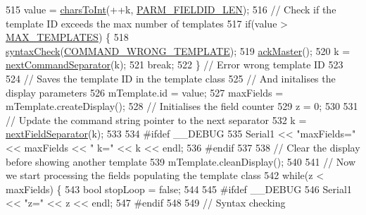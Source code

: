 \begin{DoxyCode}
515             value = \hyperlink{_meditech___chip_kit_control_panel_8pde_ad893e606e19944faa6540bba9387370f}{charsToInt}(++k, \hyperlink{_command_processor_8h_a01ff82405086f08d2af53956b5247a30}{PARM\_FIELDID\_LEN});
516             \textcolor{comment}{// Check if the template ID exceeds the max number of templates}
517             \textcolor{keywordflow}{if}(value > \hyperlink{_l_c_d_templates_8h_a0b935b9f5a6d3f57285fece1aa0a37a5}{MAX\_TEMPLATES}) \{
518               \hyperlink{_meditech___chip_kit_control_panel_8pde_a586164a6eff90eab6ba87a6ca123770d}{syntaxCheck}(\hyperlink{_parser_errors_8h_a5a9f152004095e86df06f3ac426d26fc}{COMMAND\_WRONG\_TEMPLATE});
519               \hyperlink{_meditech___chip_kit_control_panel_8pde_a4e435af9ec30d668c4cff6a97baa8e5a}{ackMaster}();
520               k = \hyperlink{_meditech___chip_kit_control_panel_8pde_a4b62bbf3dd6cf7eb7fee557932fd1b7c}{nextCommandSeparator}(k);
521               \textcolor{keywordflow}{break};
522             \} \textcolor{comment}{// Error wrong template ID}
523             
524             \textcolor{comment}{// Saves the template ID in the template class}
525             \textcolor{comment}{// And initalises the display parameters}
526             mTemplate.id = value;
527             maxFields = mTemplate.createDisplay();
528             \textcolor{comment}{// Initialises the field counter}
529             z = 0;
530 
531             \textcolor{comment}{// Update the command string pointer to the next separator}
532             k = \hyperlink{_meditech___chip_kit_control_panel_8pde_a6b0edf09b0e4b4ed48c9213d14d27efa}{nextFieldSeparator}(k); 
533 
534 \textcolor{preprocessor}{            #ifdef \_\_DEBUG}
535 \textcolor{preprocessor}{}            Serial1 << \textcolor{stringliteral}{"maxFields="} << maxFields << \textcolor{stringliteral}{" k="} << k << endl;
536 \textcolor{preprocessor}{            #endif}
537 \textcolor{preprocessor}{}            
538             \textcolor{comment}{// Clear the display before showing another template}
539             mTemplate.cleanDisplay();
540             
541             \textcolor{comment}{// Now we start processing the fields populating the template class}
542             \textcolor{keywordflow}{while}(z < maxFields) \{
543               \textcolor{keywordtype}{bool} stopLoop = \textcolor{keyword}{false};
544 
545 \textcolor{preprocessor}{              #ifdef \_\_DEBUG}
546 \textcolor{preprocessor}{}              Serial1 << \textcolor{stringliteral}{"z="} << z << endl;
547 \textcolor{preprocessor}{              #endif}
548 \textcolor{preprocessor}{}
549               \textcolor{comment}{// Syntax checking}

\end{DoxyCode}
